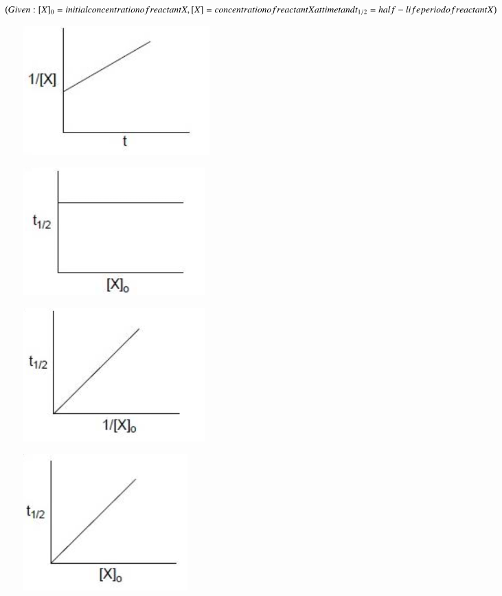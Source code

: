 \documentclass[journal,12pt,onecolumn]{IEEEtran}
\begin{document}
\begin{enumerate}
$\left(Given: [X]_0 =initial concentration of reactant X, [X] = concentration of reactant X at time t and t_{1/2} = half-life period of reactant X\right)$
    \begin{enumerate}
	\begin{figure}[h!]
	    \item \includegraphics{15a}
		    \caption*{}
		\label{fig:Q15a}
	\end{figure}
	\begin{figure}[h!]
	    \item \includegraphics{15b}
		    \caption*{}
		\label{fig:Q15b}
	\end{figure}
	\begin{figure}[h!]
	    \item \includegraphics{15c}
		    \caption*{}
		\label{fig:Q15c}
	\end{figure}
	\begin{figure}[h!]
	    \item \includegraphics{15d}

\end{figure}
\end{enumerate}
\end{enumerate}
\end{document}

